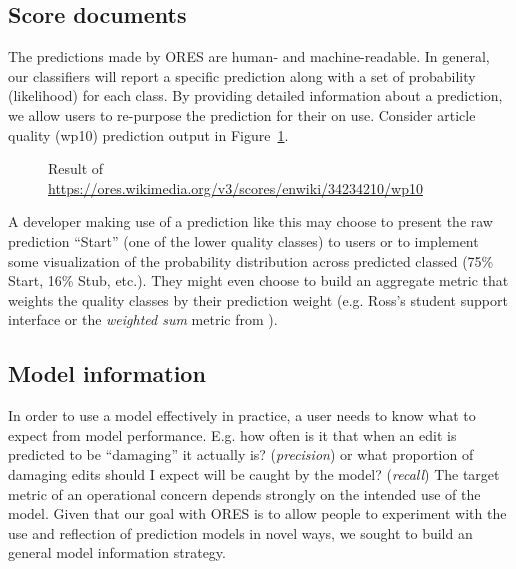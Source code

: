 \subsection{Score documents}
\label{sec:appendix.score_documents}
The predictions made by ORES are human- and machine-readable.  In general, our classifiers will report a specific prediction along with a set of probability (likelihood) for each class.  By providing detailed information about a prediction, we allow users to re-purpose the prediction for their on use.  Consider article quality (wp10) prediction output in Figure~\ref{fig:english_damaging_model_info}.

\begin{figure}[htbp]
        \caption{Result of \url{https://ores.wikimedia.org/v3/scores/enwiki/34234210/wp10}}
        \label{fig:english_damaging_model_info}
\end{figure}

A developer making use of a prediction like this may choose to present the raw prediction ``Start'' (one of the lower quality classes) to users or to implement some visualization of the probability distribution across predicted classed (75\% Start, 16\% Stub, etc.).  They might even choose to build an aggregate metric that weights the quality classes by their prediction weight (e.g. Ross's student support interface\cite{ross2016visualizing} or the \emph{weighted sum} metric from \cite{halfaker2017interpolating}).

\subsection{Model information}
\label{sec:appendix.model_information}
In order to use a model effectively in practice, a user needs to know what to expect from model performance.  E.g. how often is it that when an edit is predicted to be ``damaging'' it actually is? (\emph{precision}) or what proportion of damaging edits should I expect will be caught by the model? (\emph{recall})  The target metric of an operational concern depends strongly on the intended use of the model.  Given that our goal with ORES is to allow people to experiment with the use and reflection of prediction models in novel ways, we sought to build an general model information strategy.

